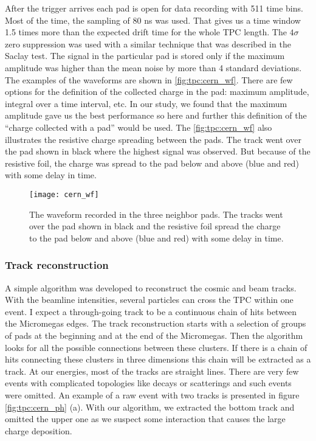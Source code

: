 \documentclass[../main.tex]{subfiles}
\begin{document}
After the trigger arrives each pad is open for data recording with 511 time bins. Most of the time, the sampling of 80 ns was used. That gives us a time window 1.5 times more than the expected drift time for the whole TPC length. The $4\sigma$ zero suppression was used with a similar technique that was described in the Saclay test. The signal in the particular pad is stored only if the maximum amplitude was higher than the mean noise by more than 4 standard deviations. The examples of the waveforms are shown in \autoref{fig:tpc:cern_wf}. There are few options for the definition of the collected charge in the pad: maximum amplitude, integral over a time interval, etc. In our study, we found that the maximum amplitude gave us the best performance so here and further this definition of the ``charge collected with a pad'' would be used. The \autoref{fig:tpc:cern_wf} also illustrates the resistive charge spreading between the pads. The track went over the pad shown in black where the highest signal was observed. But because of the resistive foil, the charge was spread to the pad below and above (blue and red) with some delay in time.

\begin{figure}[!ht]
   \centering
   \texttt{[image: cern\_wf]}
   \caption{The waveform recorded in the three neighbor pads. The tracks went over the pad shown in black and the resistive foil spread the charge to the pad below and above (blue and red) with some delay in time.}
   \label{fig:tpc:cern_wf}
 \end{figure}

\subsubsection{Track reconstruction}
A simple algorithm was developed to reconstruct the cosmic and beam tracks. With the beamline intensities, several particles can cross the TPC within one event. I expect a through-going track to be a continuous chain of hits between the Micromegas edges. The track reconstruction starts with a selection of groups of pads at the beginning and at the end of the Micromegas. Then the algorithm looks for all the possible connections between these clusters. If there is a chain of hits connecting these clusters in three dimensions this chain will be extracted as a track. At our energies, most of the tracks are straight lines. There are very few events with complicated topologies like decays or scatterings and such events were omitted. An example of a raw event with two tracks is presented in figure \autoref{fig:tpc:cern_ph} (a). With our algorithm, we extracted the bottom track and omitted the upper one as we suspect some interaction that causes the large charge deposition.
\end{document}
